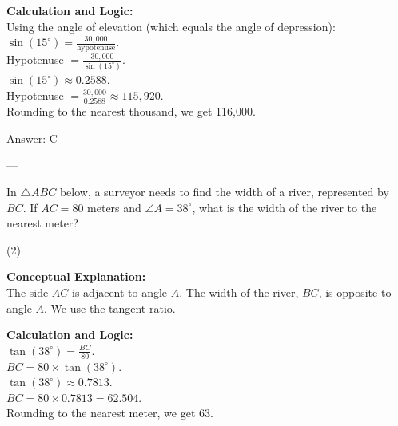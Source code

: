 \documentclass[11pt,paper=a4,answers]{exam}
\begin{document}
\begin{questions}
\begin{solution}
\vspace{10pt}
\textbf{Calculation and Logic:} \\
Using the angle of elevation (which equals the angle of depression): \\
$\sin(15^\circ) = \frac{30,000}{\text{hypotenuse}}$. \\
Hypotenuse $= \frac{30,000}{\sin(15^\circ)}$. \\
$\sin(15^\circ) \approx 0.2588$. \\
Hypotenuse $= \frac{30,000}{0.2588} \approx 115,920$. \\
Rounding to the nearest thousand, we get 116,000.

\vspace{15pt}
Answer: \colorbox{yellow!100}{C}
\end{solution}

---

\question
In $\triangle ABC$ below, a surveyor needs to find the width of a river, represented by $BC$. If $AC = 80$ meters and $\angle A = 38^\circ$, what is the width of the river to the nearest meter?
\begin{center}
\end{center}
\begin{tasks}(2)
\end{tasks}

\begin{solution}
\textbf{Conceptual Explanation:} \\
The side $AC$ is adjacent to angle $A$. The width of the river, $BC$, is opposite to angle $A$. We use the tangent ratio.

\vspace{10pt}
\textbf{Calculation and Logic:} \\
$\tan(38^\circ) = \frac{BC}{80}$. \\
$BC = 80 \times \tan(38^\circ)$. \\
$\tan(38^\circ) \approx 0.7813$. \\
$BC = 80 \times 0.7813 = 62.504$. \\
Rounding to the nearest meter, we get 63.


\end{solution}
\end{questions}
\end{document}
